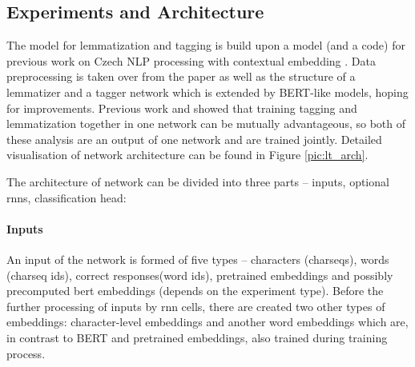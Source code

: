 \subsection{Experiments and Architecture}





The model for lemmatization and tagging is build upon a model (and a code) for previous work on Czech NLP processing with contextual embedding \citep{straka2019czech}. 
Data preprocessing is taken over from the paper as well as the structure of a lemmatizer and a tagger network which is extended by BERT-like models, hoping for improvements. Previous work \citep{Straka2019} and \citep{Straka2018} showed that training tagging and lemmatization together in one network can be mutually advantageous, so both of these analysis are an output of one network and are trained jointly. Detailed visualisation of network architecture can be found in Figure \ref{pic:lt_arch}. \par The architecture of network can be divided into three parts -- inputs, optional \acrshort{rnn}s, classification head:
\paragraph{Inputs}
An input of the network is formed of five types -- characters (charseqs), words (charseq ids), correct responses(word ids), pretrained embeddings and possibly precomputed bert embeddings (depends on the experiment type). Before the further processing of inputs by \acrshort{rnn} cells, there are created two other types of embeddings: character-level embeddings and another word embeddings which are, in contrast to BERT and pretrained embeddings, also trained during training process.

